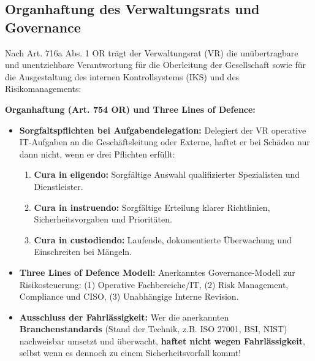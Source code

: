 \subsection{Organhaftung des Verwaltungsrats und Governance}

Nach Art. 716a Abs. 1 OR trägt der Verwaltungsrat (VR) die unübertragbare und unentziehbare Verantwortung für die Oberleitung der Gesellschaft sowie für die Ausgestaltung des internen Kontrollsystems (IKS) und des Risikomanagements:

\begin{theorem}
    \textbf{Organhaftung (Art. 754 OR) und Three Lines of Defence:}
    \begin{itemize}
        \item \textbf{Sorgfaltspflichten bei Aufgabendelegation:} Delegiert der VR operative IT-Aufgaben an die Geschäftsleitung oder Externe, haftet er bei Schäden nur dann nicht, wenn er drei Pflichten erfüllt:
        \begin{enumerate}
            \item \textbf{Cura in eligendo:} Sorgfältige Auswahl qualifizierter Spezialisten und Dienstleister.
            \item \textbf{Cura in instruendo:} Sorgfältige Erteilung klarer Richtlinien, Sicherheitsvorgaben und Prioritäten.
            \item \textbf{Cura in custodiendo:} Laufende, dokumentierte Überwachung und Einschreiten bei Mängeln.
        \end{enumerate}
        \item \textbf{Three Lines of Defence Modell:} Anerkanntes Governance-Modell zur Risikosteuerung: (1) Operative Fachbereiche/IT, (2) Risk Management, Compliance und CISO, (3) Unabhängige Interne Revision.
        \item \textbf{Ausschluss der Fahrlässigkeit:} Wer die anerkannten \textbf{Branchenstandards} (Stand der Technik, z.B. ISO 27001, BSI, NIST) nachweisbar umsetzt und überwacht, \textbf{haftet nicht wegen Fahrlässigkeit}, selbst wenn es dennoch zu einem Sicherheitsvorfall kommt!
    \end{itemize}
\end{theorem}

